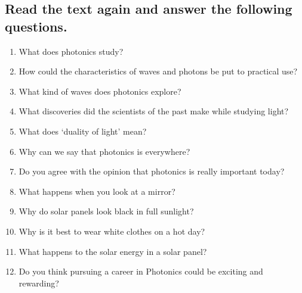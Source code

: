 \subsection*{Read the text again and answer the following questions.}
\begin{enumerate}
      \item What does photonics study?
      \item How could the characteristics of waves and photons be put to practical use?
      \item What kind of waves does photonics explore?
      \item What discoveries did the scientists of the past make while studying light?
      \item What does ‘duality of light’ mean?
      \item Why can we say that photonics is everywhere?
      \item Do you agree with the opinion that photonics is really important today?
      \item What happens when you look at a mirror?
      \item Why do solar panels look black in full sunlight?
      \item Why is it best to wear white clothes on a hot day?
      \item What happens to the solar energy in a solar panel?
      \item Do you think pursuing a career in Photonics could be exciting and rewarding?
\end{enumerate}

